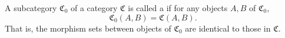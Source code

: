 A subcategory $\mathfrak{C}_0$ of a category $\mathfrak{C}$ is called a  if for any objects $A, B$ of $\mathfrak{C}_0$,
$$\mathfrak{C}_0(A, B) = \mathfrak{C}(A, B).$$
That is, the morphism sets between objects of $\mathfrak{C}_0$ are identical to those in $\mathfrak{C}$.
